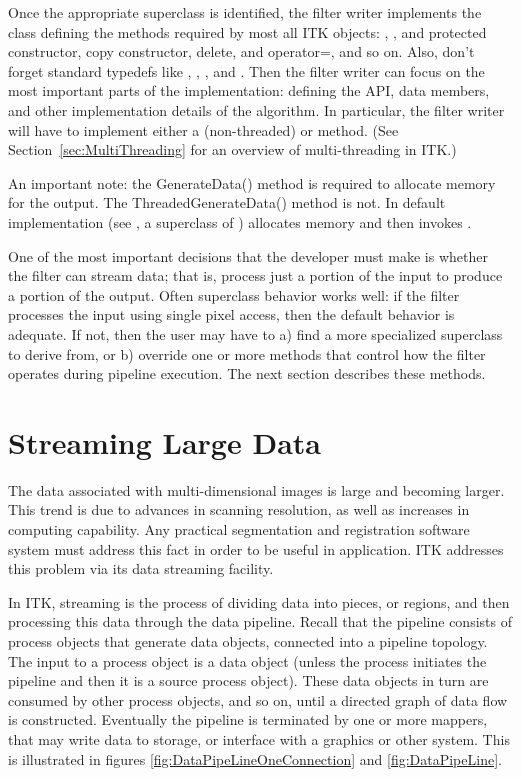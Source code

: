 Once the appropriate superclass is identified, the filter writer
implements the class defining the methods required by most all ITK
objects: , , and protected constructor,
copy constructor, delete, and operator=, and so on. Also, don't forget
standard typedefs like , , , and
. Then the filter writer can focus on the most important
parts of the implementation: defining the API, data members, and other
implementation details of the algorithm. In particular, the filter writer
will have to implement either a  (non-threaded) or
 method. (See Section~\ref{sec:MultiThreading}
for an overview of multi-threading in ITK.)

An important note: the GenerateData() method is required to allocate memory
for the output. The ThreadedGenerateData() method is not. In default
implementation (see , a superclass of
)
 allocates memory and then invokes
.

One of the most important decisions that the developer must make is whether
the filter can stream data; that is, process just a portion of the input to
produce a portion of the output. Often superclass behavior works well: if the
filter processes the input using single pixel access, then the default
behavior is adequate. If not, then the user may have to a) find a more
specialized superclass to derive from, or b) override one or more methods
that control how the filter operates during pipeline execution. The next
section describes these methods.



\section{Streaming Large Data}
\label{sec:StreamingLargeData}

The data associated with multi-dimensional images is large and becoming larger.
This trend is due to advances in scanning resolution, as well as increases in
computing capability. Any practical segmentation and registration software
system must address this fact in order to be useful in application. ITK
addresses this problem via its data streaming facility.

In ITK, streaming is the process of dividing data into pieces, or regions,
and then processing this data through the data pipeline. Recall that the
pipeline consists of process objects that generate data objects, connected
into a pipeline topology. The input to a process object is a data object
(unless the process initiates the pipeline and then it is a source process
object). These data objects in turn are consumed by other process objects,
and so on, until a directed graph of data flow is constructed. Eventually the
pipeline is terminated by one or more mappers, that may write data to
storage, or interface with a graphics or other system. This is illustrated in 
figures \ref{fig:DataPipeLineOneConnection} and \ref{fig:DataPipeLine}.

